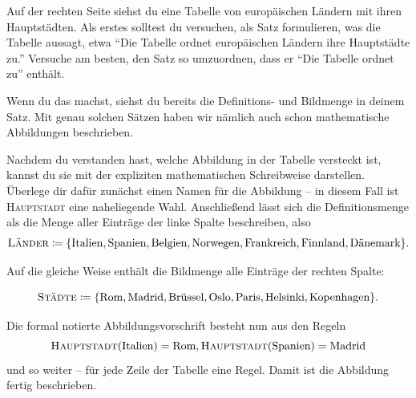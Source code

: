 \documentclass[../../main.tex]{subfiles}
\begin{document}
\begin{example}{}
    
    Auf der rechten Seite siehst du eine Tabelle von europäischen Ländern mit ihren Hauptstädten. Als erstes solltest du versuchen, als Satz formulieren, was die Tabelle aussagt, etwa \enquote{Die Tabelle ordnet europäischen Ländern ihre Hauptstädte zu.} Versuche am besten, den Satz so umzuordnen, dass er \enquote{Die Tabelle ordnet zu} enthält.
    
    Wenn du das machst, siehst du bereits die Definitions- und Bildmenge in deinem Satz. Mit genau solchen Sätzen haben wir nämlich auch schon mathematische Abbildungen beschrieben.
    
    Nachdem du verstanden hast, welche Abbildung in der Tabelle versteckt ist, kannst du sie mit der expliziten mathematischen Schreibweise darstellen. Überlege dir dafür zunächst einen Namen für die Abbildung -- in diesem Fall ist \textsc{Hauptstadt} eine naheliegende Wahl. Anschließend lässt sich die Definitionsmenge als die Menge aller Einträge der linke Spalte beschreiben, also
    \[\textsc{Länder}\coloneqq\{\text{Italien},\text{Spanien},\text{Belgien},\text{Norwegen},\text{Frankreich},\text{Finnland},\text{Dänemark}\}.\]
    
    Auf die gleiche Weise enthält die Bildmenge alle Einträge der rechten Spalte:
    
    \[\textsc{Städte}\coloneqq\{\text{Rom},\text{Madrid},\text{Brüssel},\text{Oslo},\text{Paris},\text{Helsinki},\text{Kopenhagen}\}.\]
    
    \sloppy
    Die formal notierte Abbildungsvorschrift besteht nun aus den Regeln \[\textsc{Hauptstadt}(\text{Italien})=\text{Rom}, \textsc{Hauptstadt}(\text{Spanien})=\text{Madrid}\] und so weiter -- für jede Zeile der Tabelle eine Regel. Damit ist die Abbildung fertig beschrieben.
    \fussy
\end{example}
\end{document}
